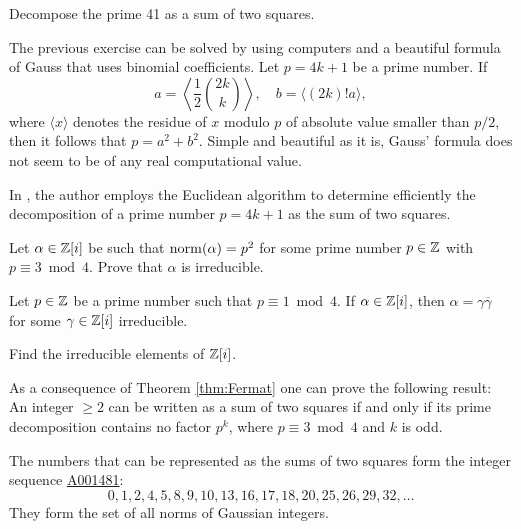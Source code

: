 \begin{exercise}
    Decompose the prime 41 as a sum of two squares. 
\end{exercise}

The previous exercise can be solved by using computers and 
a beautiful formula of Gauss that uses binomial coefficients. Let $p=4k+1$ be a prime number. 
If 
\[
a=\left\langle \frac12\binom{2k}{k}\right\rangle, 
\quad
b=\langle (2k)!a\rangle,
\]
where $\langle x\rangle$ denotes the 
residue of $x$ modulo $p$ of absolute value smaller than $p/2$, 
then it follows that $p=a^2+b^2$. Simple and beautiful as it is, Gauss' formula does not seem to be of any real computational value. 

In \cite{MR1041889}, the author employs the Euclidean algorithm to determine efficiently 
the decomposition of a prime number $p=4k+1$ as the sum of two squares.

\begin{exercise}
\label{xca:p=3(4)}
    Let $\alpha\in\mathbb{Z}[i]$ be such that $\operatorname{norm}(\alpha)=p^2$ 
    for some prime number $p\in\mathbb{Z}$ with $p\equiv3\bmod 4$. 
    Prove that $\alpha$ is irreducible. 
\end{exercise}

\begin{exercise}
    \label{xca:p=1(4)}
    Let $p\in\mathbb{Z}$ be a prime number such that $p\equiv1\bmod 4$.
    If $\alpha\in\mathbb{Z}[i]$, then $\alpha=\gamma\overline{\gamma}$
    for some $\gamma\in\mathbb{Z}[i]$ irreducible. 
\end{exercise}

\begin{exercise}
\label{xca:Z[i]irreducibles}
Find the irreducible elements of $\mathbb{Z}[i]$. 
\end{exercise}

As a consequence of Theorem \ref{thm:Fermat}
one can prove the following result: An integer $\geq2$ can be written as a sum of two squares if and only if its prime decomposition contains no factor $p^k$, where 
$p\equiv 3\bmod 4$ 
and $k$ is odd. 

The numbers that can be represented as the sums of two squares form the integer sequence \href{https://oeis.org/A001481}{A001481}: 
\[
0, 1, 2, 4, 5, 8, 9, 10, 13, 16, 17, 18, 20, 25, 26, 29, 32,\dots 
\] 
They form the set of all norms of Gaussian integers. 


